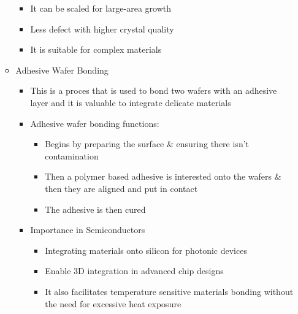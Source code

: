 \documentclass[conference]{IEEEtran}
\begin{document}
\begin{itemize}
\begin{itemize}
\begin{itemize}
          \item It can be scaled for large-area growth 
            
          \item Less defect with higher crystal quality

          \item It is suitable for complex materials 

        \end{itemize}

      \item Adhesive Wafer Bonding 

        \begin{itemize}

          \item This is a proces that is used to bond two wafers with an adhesive layer and it is valuable to integrate delicate materials 

          \item Adhesive wafer bonding functions: 

            \begin{itemize}

              \item Begins by preparing the surface \& ensuring there isn’t contamination 

              \item Then a polymer based adhesive is interested onto the wafers \& then they are aligned and put in contact 

              \item The adhesive is then cured 

            \end{itemize}

          \item Importance in Semiconductors 

            \begin{itemize}

              \item Integrating materials onto silicon for photonic devices 

              \item Enable 3D integration in advanced chip designs 

              \item It also facilitates temperature sensitive materials bonding without the need for excessive heat exposure 

            \end{itemize}


\end{itemize}
\end{itemize}
\end{itemize}
\end{document}
